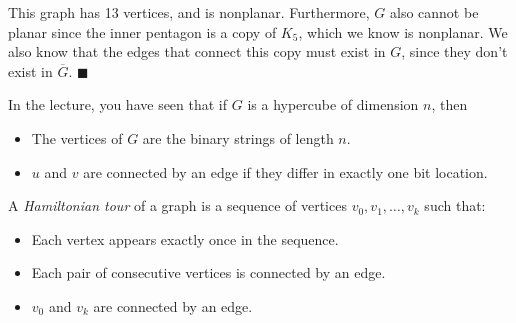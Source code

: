 \documentclass[11pt]{article}
\begin{document}
\begin{Parts}
\begin{solution}
        This graph has 13 vertices, and is nonplanar. Furthermore, $G$ also cannot be planar since the inner pentagon is a copy of $K_5$, which we know is nonplanar. We also know that the edges that connect this copy must exist in $G$, since they don't exist in $\overline G$. $\blacksquare$     
    \end{solution}


\end{Parts}
\pagebreak
{} 

In the lecture, you have seen that if $G$ is a hypercube of dimension $n$, then
\begin{itemize}
    \item The vertices of $G$ are the binary strings of length $n$.
    \item $u$ and $v$ are connected by an edge if they differ in exactly one bit location.
\end{itemize}

A \emph{Hamiltonian tour} of a graph is a sequence of vertices
$v_0, v_1, \ldots, v_k$ such that:
\begin{itemize}
    \item Each vertex appears exactly once in the sequence.
    \item Each pair of consecutive vertices is connected by an edge.
    \item $v_0$ and $v_k$ are connected by an edge.
\end{itemize}
\end{document}

